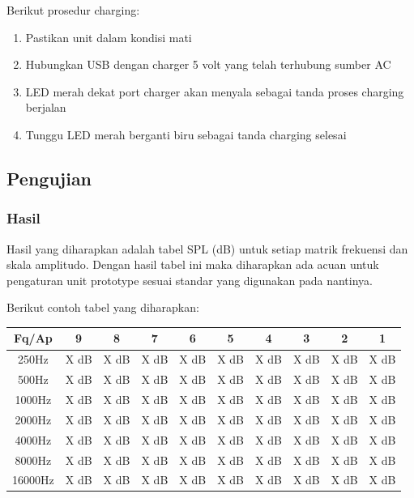 \documentclass[12pt,]{article}
\begin{document}
	Berikut prosedur charging:
	\begin{enumerate}
		\item Pastikan unit dalam kondisi mati
		\item Hubungkan USB dengan charger 5 volt yang telah terhubung sumber AC
		\item LED merah dekat port charger akan menyala sebagai tanda proses charging berjalan
		\item Tunggu LED merah berganti biru sebagai tanda charging selesai
	\end{enumerate}

	\newpage
	\subsection{Pengujian}
	
	\subsubsection{Hasil}
	
	Hasil yang diharapkan adalah tabel SPL (dB) untuk setiap matrik frekuensi dan skala amplitudo.
	Dengan hasil tabel ini maka diharapkan ada acuan untuk pengaturan unit prototype sesuai standar yang digunakan pada nantinya.
	
	Berikut contoh tabel yang diharapkan:
	
	\begin{center}
		\begin{tabular}{|c|c|c|c|c|c|c|c|c|c|} 
			\hline
			Fq/Ap & 9 & 8 & 7 & 6 & 5 & 4 & 3 & 2 & 1\\ [0.5ex] 
			\hline\hline
			250Hz & X dB & X dB & X dB & X dB & X dB & X dB & X dB & X dB & X dB\\
			\hline
			500Hz & X dB & X dB & X dB & X dB & X dB & X dB & X dB & X dB & X dB\\
			\hline
			1000Hz & X dB & X dB & X dB & X dB & X dB & X dB & X dB & X dB & X dB\\
			\hline
			2000Hz & X dB & X dB & X dB & X dB & X dB & X dB & X dB & X dB & X dB\\
			\hline
			4000Hz & X dB & X dB & X dB & X dB & X dB & X dB & X dB & X dB & X dB\\
			\hline
			8000Hz & X dB & X dB & X dB & X dB & X dB & X dB & X dB & X dB & X dB\\
			\hline
			16000Hz & X dB & X dB & X dB & X dB & X dB & X dB & X dB & X dB & X dB\\
			\hline
		\end{tabular}
	\end{center}
	
\end{document}
